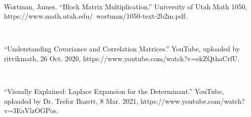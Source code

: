 \documentclass{article}
\begin{document}
\

Wortman, James. “Block Matrix Multiplication.” University of Utah Math 1050, https://www.math.utah.edu/~wortman/1050-text-2b2m.pdf. 

\

“Understanding Covariance and Correlation Matrices.” YouTube, uploaded by ritvikmath, 26 Oct. 2020, https://www.youtube.com/watch?v=ekZQthaCrfU. 

\

“Visually Explained: Laplace Expansion for the Determinant.” YouTube, uploaded by Dr. Trefor Bazett, 8 Mar. 2021, https://www.youtube.com/watch?v=3EaVlzOGPos.
\end{document}
